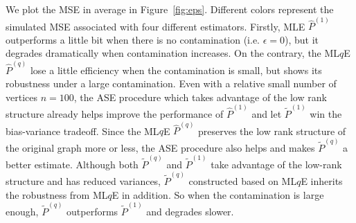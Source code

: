 \documentclass[a4paper]{article}
\renewcommand{\hat}{\widehat}
\begin{document}
We plot the MSE in average in Figure~\ref{fig:eps}. Different colors represent the simulated MSE associated with four different estimators.
Firstly, MLE $\hat{P}^{(1)}$ outperforms a little bit when there is no contamination (i.e. $\epsilon = 0$), but it degrades dramatically when contamination increases. On the contrary, the ML$q$E $\hat{P}^{(q)}$ lose a little efficiency when the contamination is small, but shows its robustness under a large contamination.
Even with a relative small number of vertices $n = 100$, the ASE procedure which takes advantage of the low rank structure already helps improve the performance of $\hat{P}^{(1)}$ and let $\widetilde{P}^{(1)}$ win the bias-variance tradeoff. Since the ML$q$E $\hat{P}^{(q)}$ preserves the low rank structure of the original graph more or less, the ASE procedure also helps and makes $\widetilde{P}^{(q)}$ a better estimate. Although both $\widetilde{P}^{(q)}$ and $\widetilde{P}^{(1)}$ take advantage of the low-rank structure and has reduced variances, $\widetilde{P}^{(q)}$ constructed based on ML$q$E inherits the robustness from ML$q$E in addition. So when the contamination is large enough, $\widetilde{P}^{(q)}$ outperforms $\widetilde{P}^{(1)}$ and degrades slower.
\end{document}
